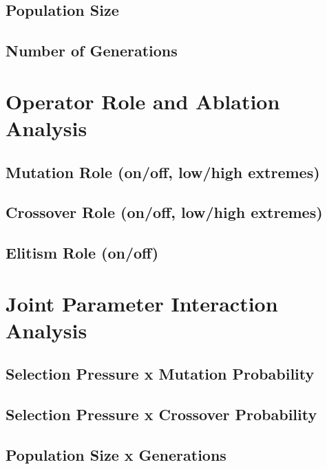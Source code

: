 \documentclass[12pt,a4paper]{report}
\begin{document}
\section{Population Size}

\section{Number of Generations}

\chapter{Operator Role and Ablation Analysis}
\section{Mutation Role (on/off, low/high extremes)}

\section{Crossover Role (on/off, low/high extremes)}

\section{Elitism Role (on/off)}

\chapter{Joint Parameter Interaction Analysis}
\section{Selection Pressure x Mutation Probability}

\section{Selection Pressure x Crossover Probability}

\section{Population Size x Generations}
\end{document}

